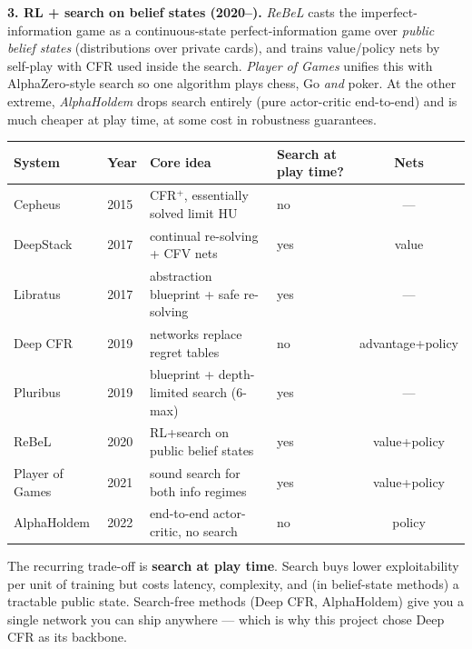 \documentclass[11pt,a4paper]{article}
\begin{document}
\textbf{3. RL + search on belief states (2020--).} \emph{ReBeL} casts the
imperfect-information game as a continuous-state perfect-information game over
\emph{public belief states} (distributions over private cards), and trains
value/policy nets by self-play with CFR used inside the search.
\emph{Player of Games} unifies this with AlphaZero-style search so one
algorithm plays chess, Go \emph{and} poker. At the other extreme,
\emph{AlphaHoldem} drops search entirely (pure actor-critic end-to-end) and
is much cheaper at play time, at some cost in robustness guarantees.

\begin{center}
\small
\begin{tabular}{@{}llllc@{}}
\toprule
System & Year & Core idea & Search at play time? & Nets \\
\midrule
Cepheus        & 2015 & CFR$^{+}$, essentially solved limit HU      & no  & --- \\
DeepStack      & 2017 & continual re-solving + CFV nets             & yes & value \\
Libratus       & 2017 & abstraction blueprint + safe re-solving     & yes & --- \\
Deep CFR       & 2019 & networks replace regret tables              & no  & advantage+policy \\
Pluribus       & 2019 & blueprint + depth-limited search (6-max)    & yes & --- \\
ReBeL          & 2020 & RL+search on public belief states           & yes & value+policy \\
Player of Games& 2021 & sound search for both info regimes          & yes & value+policy \\
AlphaHoldem    & 2022 & end-to-end actor-critic, no search          & no  & policy \\
\bottomrule
\end{tabular}
\end{center}

\begin{intuition}
The recurring trade-off is \textbf{search at play time}. Search buys lower
exploitability per unit of training but costs latency, complexity, and (in
belief-state methods) a tractable public state. Search-free methods (Deep CFR,
AlphaHoldem) give you a single network you can ship anywhere --- which is why
this project chose Deep CFR as its backbone.
\end{intuition}

\end{document}
